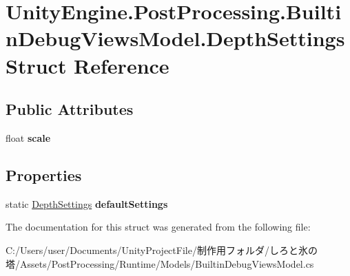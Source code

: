 \hypertarget{struct_unity_engine_1_1_post_processing_1_1_builtin_debug_views_model_1_1_depth_settings}{}\section{Unity\+Engine.\+Post\+Processing.\+Builtin\+Debug\+Views\+Model.\+Depth\+Settings Struct Reference}
\label{struct_unity_engine_1_1_post_processing_1_1_builtin_debug_views_model_1_1_depth_settings}
\subsection*{Public Attributes}
\begin{DoxyCompactItemize}
\item 
\mbox{\label{struct_unity_engine_1_1_post_processing_1_1_builtin_debug_views_model_1_1_depth_settings_a42df42d4c46463f482eb4221558d70f6}} 
float {\bfseries scale}
\end{DoxyCompactItemize}
\subsection*{Properties}
\begin{DoxyCompactItemize}
\item 
\mbox{\label{struct_unity_engine_1_1_post_processing_1_1_builtin_debug_views_model_1_1_depth_settings_a1270abe980a84e80675fad750ff67b0d}} 
static \hyperlink{struct_unity_engine_1_1_post_processing_1_1_builtin_debug_views_model_1_1_depth_settings}{Depth\+Settings} {\bfseries default\+Settings}
\end{DoxyCompactItemize}


The documentation for this struct was generated from the following file\+:\begin{DoxyCompactItemize}
\item 
C\+:/\+Users/user/\+Documents/\+Unity\+Project\+File/制作用フォルダ/しろと氷の塔/\+Assets/\+Post\+Processing/\+Runtime/\+Models/Builtin\+Debug\+Views\+Model.\+cs\end{DoxyCompactItemize}
